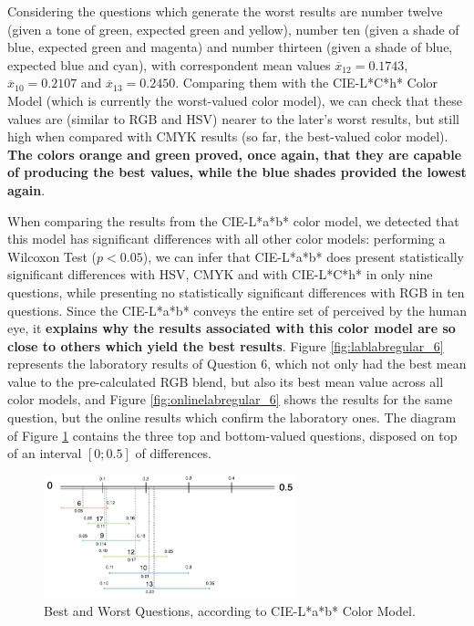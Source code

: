 %
Considering the questions which generate the worst results are number twelve (given a tone of green, expected green and yellow), number ten (given a shade of blue, expected green and magenta) and number thirteen
(given a shade of blue, expected blue and cyan), with correspondent mean values $\overline{x}_{12} = 0.1743$, $\overline{x}_{10} = 0.2107$ and $\overline{x}_{13} = 0.2450$. Comparing them with the CIE-L*C*h* Color Model
(which is currently the worst-valued color model), we can check that these values are (similar to RGB and HSV) nearer to the later's worst results, but still high when compared with CMYK results (so far, the
best-valued color model). \textbf{The colors orange and green proved, once again, that they are capable of producing the best values, while the blue shades provided the lowest again}. \par
%
When comparing the results from the CIE-L*a*b* color model, we detected that this model has significant differences with all other color models: performing a Wilcoxon Test ($p < 0.05$), we can infer that
CIE-L*a*b* does present statistically significant differences with HSV, CMYK and with CIE-L*C*h* in only nine questions, while presenting no statistically significant differences with RGB
in ten questions.
Since the CIE-L*a*b* conveys the entire set of perceived by the human eye, it \textbf{explains why the results associated with this color model are so close to others which yield the best results}.
Figure \ref{fig:lablabregular_6} represents the laboratory results of Question 6, which not only had the best mean value to the pre-calculated RGB blend, but also its best mean value across all color models,
and Figure \ref{fig:onlinelabregular_6} shows the results for the same question, but the online results which confirm the laboratory ones. The diagram of Figure \ref{fig:lab_analysis} contains the three top and bottom-valued questions, disposed on top of an interval $[0 ; 0.5]$ of differences. \par
%
\begin{figure}[!htbp]
  \centering
  \vspace{-15pt}
  \includegraphics[width=0.65\textwidth]{images/results/lab_questions_analysis.png}
  \caption[Best and Worst Questions, according to CIE-L*a*b* Color Model.]{Best and Worst Questions, according to CIE-L*a*b* Color Model.}
  \vspace{-5pt}
  \label{fig:lab_analysis}
\end{figure}
%
